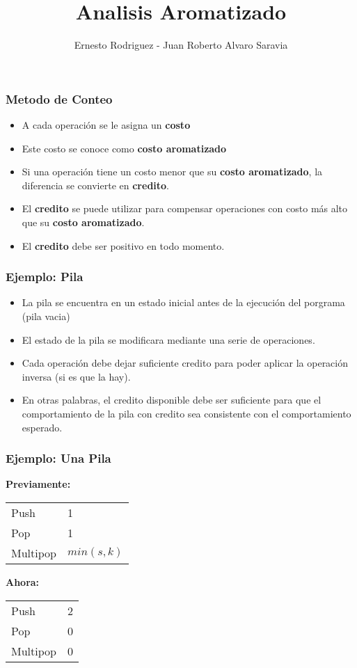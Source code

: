 \documentclass{beamer}
\title[Codiciosos]{Analisis Aromatizado}
\author{Ernesto Rodriguez - Juan Roberto Alvaro Saravia}
\institute{
    Universidad Francisco Marroquin \\
    \medskip \textit{ernestorodriguez@ufm.edu - juanalvarado@ufm.edu}
}
\date[\today]{}
\begin{document}
\begin{frame}
\titlepage
\end{frame}

\begin{frame}
\frametitle{Metodo de Conteo}
\begin{itemize}
    \item{A cada operaci\'on se le asigna un {\bf costo}}
    \item{Este costo se conoce como {\bf costo aromatizado}}
    \item{Si una operaci\'on tiene un costo menor que su
    {\bf costo aromatizado}, la diferencia se convierte
    en {\bf credito}.}
    \item{El {\bf credito} se puede utilizar para compensar
    operaciones con costo m\'as alto que su {\bf costo aromatizado}.}
    \item{El {\bf credito} debe ser positivo en todo momento.}
\end{itemize}
\end{frame}

\begin{frame}
\frametitle{Ejemplo: Pila}
\begin{itemize}
    \item{La pila se encuentra en un estado inicial antes
    de la ejecuci\'on del porgrama (pila vacia)}
    \item{El estado de la pila se modificara mediante
    una serie de operaciones.}
    \item{Cada operaci\'on debe dejar suficiente credito
    para poder aplicar la operaci\'on inversa (si es que la hay).}
    \item{En otras palabras, el credito disponible debe ser suficiente
    para que el comportamiento de la pila con credito sea consistente
    con el comportamiento esperado.}
\end{itemize}
\end{frame}

\begin{frame}
\frametitle{Ejemplo: Una Pila}
{\bf Previamente:}
\begin{tabular}{l l}
    Push & 1 \\
    Pop & 1 \\
    Multipop & $min(s,k)$
\end{tabular}
{\bf Ahora:}
\begin{tabular}{l l}
    Push & 2 \\
    Pop & 0 \\
    Multipop & 0
\end{tabular}
\end{frame}
\end{document}

